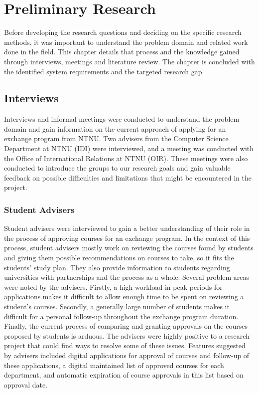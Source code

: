 \chapter{Preliminary Research} \label{chap:2}

Before developing the research questions and deciding on the specific research methods, it was important to understand the problem domain and related work done in the field. This chapter details that process and the knowledge gained through interviews, meetings and literature review. The chapter is concluded with the identified system requirements and the targeted research gap.

\section{Interviews}

Interviews and informal meetings were conducted to understand the problem domain and gain information on the current approach of applying for an exchange program from NTNU. Two advisers from the Computer Science Department at NTNU (IDI) were interviewed, and a meeting was conducted with the Office of International Relations at NTNU (OIR). These meetings were also conducted to introduce the groups to our research goals and gain valuable feedback on possible difficulties and limitations that might be encountered in the project.

\subsection{Student Advisers} 

Student advisers were interviewed to gain a better understanding of their role in the process of approving courses for an exchange program. In the context of this process, student advisers mostly work on reviewing the courses found by students and giving them possible recommendations on courses to take, so it fits the students' study plan. They also provide information to students regarding universities with partnerships and the process as a whole. Several problem areas were noted by the advisers. Firstly, a high workload in peak periods for applications makes it difficult to allow enough time to be spent on reviewing a student's courses. Secondly, a generally large number of students makes it difficult for a personal follow-up throughout the exchange program duration. Finally, the current process of comparing and granting approvals on the courses proposed by students is arduous. The advisers were highly positive to a research project that could find ways to resolve some of these issues. Features suggested by advisers included digital applications for approval of courses and follow-up of these applications, a digital maintained list of approved courses for each department, and automatic expiration of course approvals in this list based on approval date.


